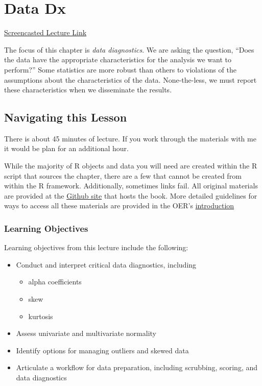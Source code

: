 \documentclass[
  11pt,
]{book}
\providecommand{\tightlist}{%
  \setlength{\itemsep}{0pt}\setlength{\parskip}{0pt}}
\begin{document}
\hypertarget{DataDx}{%
\chapter{Data Dx}\label{DataDx}}

\href{https://spu.hosted.panopto.com/Panopto/Pages/Viewer.aspx?pid=43dbe818-8186-498d-8e84-acf7000acb5b}{Screencasted Lecture Link}

The focus of this chapter is \emph{data diagnostics}. We are asking the question, ``Does the data have the appropriate characteristics for the analysis we want to perform?'' Some statistics are more robust than others to violations of the assumptions about the characteristics of the data. None-the-less, we must report these characteristics when we disseminate the results.

\hypertarget{navigating-this-lesson-2}{%
\section{Navigating this Lesson}\label{navigating-this-lesson-2}}

There is about 45 minutes of lecture. If you work through the materials with me it would be plan for an additional hour.

While the majority of R objects and data you will need are created within the R script that sources the chapter, there are a few that cannot be created from within the R framework. Additionally, sometimes links fail. All original materials are provided at the \href{https://github.com/lhbikos/ReC_MultivModel}{Github site} that hosts the book. More detailed guidelines for ways to access all these materials are provided in the OER's \protect\hyperlink{ReCintro}{introduction}

\hypertarget{learning-objectives-2}{%
\subsection{Learning Objectives}\label{learning-objectives-2}}

Learning objectives from this lecture include the following:

\begin{itemize}
\tightlist
\item
  Conduct and interpret critical data diagnostics, including

  \begin{itemize}
  \tightlist
  \item
    alpha coefficients
  \item
    skew
  \item
    kurtosis
  \end{itemize}
\item
  Assess univariate and multivariate normality
\item
  Identify options for managing outliers and skewed data
\item
  Articulate a workflow for data preparation, including scrubbing, scoring, and data diagnostics
\end{itemize}
\end{document}
